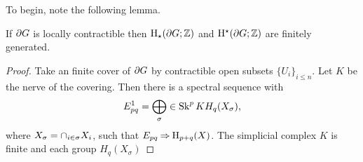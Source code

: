 \documentclass[a4paper]{article}
\begin{document}
To begin, note the following lemma.

\begin{lemma}
  If $\partial G$ is locally contractible then $\mathrm{H}_\star(\partial G;
  \mathbb{Z})$ and $\mathrm{H}^\star(\partial G; \mathbb{Z})$ are finitely
  generated.
\end{lemma}

\begin{proof}
  Take an finite cover of $\partial G$ by contractible open subsets
  $\{U_i\}_{i \leq n}$. Let $K$ be the nerve of the covering. Then there is a
  spectral sequence with 
  \begin{align}
    E^1_{pq} = \bigoplus_\sigma\in\operatorname{Sk}^{p} K H_q(X_\sigma),
  \end{align}
  where $X_\sigma = \cap_{i \in \sigma} X_i$, such that
  $E_{pq}\mathbin{\Rightarrow} \mathrm{H}_{p+q}(X)$. The simplicial complex $K$ is finite
  and each group $H_q(X_\sigma)$
\end{proof}


\end{document}
